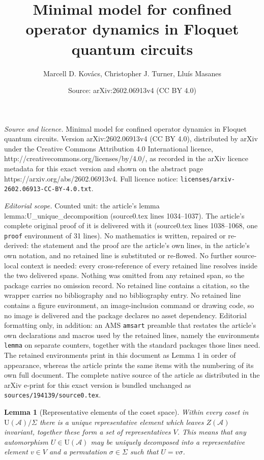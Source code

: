 \documentclass[10pt,a4paper]{amsart}
\title{Minimal model for confined operator dynamics in Floquet quantum circuits}
\author{Marcell D. Kov\'acs, Christopher J. Turner, Llu\'is Masanes}
\date{Source: arXiv:2602.06913v4 (CC BY 4.0)}
\newtheorem{lemma}{Lemma}
\begin{document}
\maketitle

\noindent\emph{Source and licence.} Minimal model for confined operator dynamics in Floquet quantum circuits. Version arXiv:2602.06913v4 (CC BY 4.0), distributed by arXiv under the Creative Commons Attribution 4.0 International licence, http://creativecommons.org/licenses/by/4.0/, as recorded in the arXiv licence metadata for this exact version and shown on the abstract page https://arxiv.org/abs/2602.06913v4. Full licence notice: \texttt{licenses/arxiv-2602.06913-CC-BY-4.0.txt}.\par\smallskip

\noindent\textit{Editorial scope.} Counted unit: the article's lemma lemma:U\_unique\_decomposition (source0.tex lines 1034--1037). The article's complete original proof of it is delivered with it (source0.tex lines 1038--1068, one \texttt{proof} environment of 31 lines). No mathematics is written, repaired or re-derived: the statement and the proof are the article's own lines, in the article's own notation, and no retained line is substituted or re-flowed.  No further source-local context is needed: every cross-reference of every retained line resolves inside the two delivered spans.  Nothing was omitted from any retained span, so the package carries no omission record.  No retained line contains a citation, so the wrapper carries no bibliography and no bibliography entry.  No retained line contains a figure environment, an image-inclusion command or drawing code, so no image is delivered and the package declares no asset dependency.  Editorial formatting only, in addition: an AMS \texttt{amsart} preamble that restates the article's own declarations and macros used by the retained lines, namely the environments \texttt{lemma} on separate counters, together with the standard packages those lines need.  The retained environments print in this document as Lemma 1 in order of appearance, whereas the article prints the same items with the numbering of its own full document.  The complete native source of the article as distributed in the arXiv e-print for this exact version is bundled unchanged as \texttt{sources/194139/source0.tex}.
\begin{lemma}[Representative elements of the coset space]  
    Within every coset in $\mathrm{U}(\mathcal{A})/\Sigma$ there is a unique representative element which leaves $Z(\mathcal{A})$ invariant, together these form a set of representatives $V$. This means that any automorphism $U \in \mathrm{U}(\mathcal{A})$ may be uniquely decomposed into a representative element $v \in V$ and a permutation $\sigma \in \Sigma$ such that $U = v \sigma$.
    \label{lemma:U_unique_decomposition}
\end{lemma}
\end{document}
